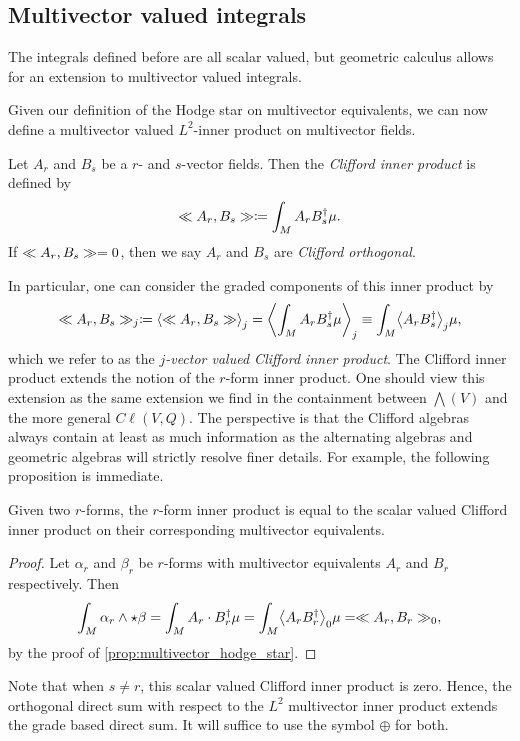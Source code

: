 \subsection{Multivector valued integrals}

The integrals defined before are all scalar valued, but geometric calculus allows for an extension to multivector valued integrals. 

Given our definition of the Hodge star on multivector equivalents, we can now define a multivector valued $L^2$-inner product on multivector fields.

\begin{definition}
Let $A_r$ and $B_s$ be a $r$- and $s$-vector fields. Then the \emph{Clifford inner product} is defined by
\begin{equation}
\ll A_r, B_s\gg \coloneqq \int_M A_r B_s^\dagger \mu.
\end{equation}
If $\ll A_r, B_s\gg = 0$, then we say $A_r$ and $B_s$ are \emph{Clifford orthogonal}.
\end{definition}
In particular, one can consider the graded components of this inner product by
\begin{equation}
\multivecinnerproduct{A_r}{B_s}_j \coloneqq \proj{j}{\multivecinnerproduct{A_r}{B_s}} = \proj{j}{\int_M A_r B_s^\dagger \mu} \equiv \int_M \proj{j}{A_r B_s^\dagger} \mu,
\end{equation}
which we refer to as the \emph{$j$-vector valued Clifford inner product}. The Clifford inner product extends the notion of the $r$-form inner product.  One should view this extension as the same extension we find in the containment between $\bigwedge(V)$ and the more general $C\ell(V,Q)$. The perspective is that the Clifford algebras always contain at least as much information as the alternating algebras and geometric algebras will strictly resolve finer details. For example, the following proposition is immediate.
\begin{proposition}
Given two $r$-forms, the $r$-form inner product is equal to the scalar valued Clifford inner product on their corresponding multivector equivalents.
\end{proposition}
\begin{proof}
Let $\alpha_r$ and $\beta_r$ be $r$-forms with multivector equivalents $A_r$ and $B_r$ respectively. Then
\begin{align*}
    \int_M \alpha_r \wedge \star \beta = \int_M A_r \cdot B_r^\dagger \mu = \int_M \proj{0}{A_rB_r^\dagger} \mu = \multivecinnerproduct{A_r}{B_r}_0,
\end{align*}
by the proof of \cref{prop:multivector_hodge_star}. 
\end{proof}
Note that when $s\neq r$, this scalar valued Clifford inner product is zero. Hence, the orthogonal direct sum with respect to the $L^2$ multivector inner product extends the grade based direct sum. It will suffice to use the symbol $\oplus$ for both. 

